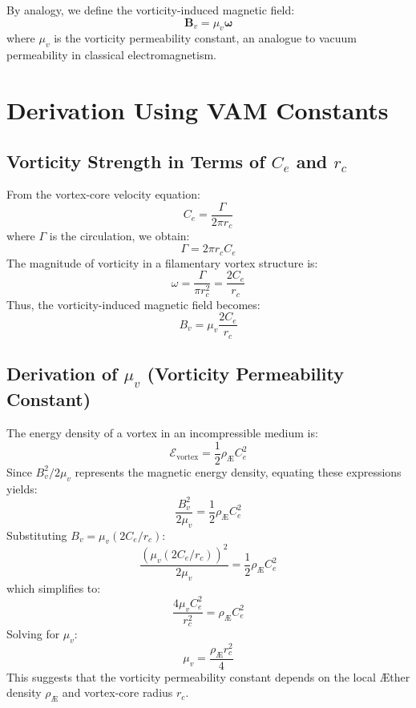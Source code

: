 By analogy, we define the vorticity-induced magnetic field:
\begin{equation}
    \boldsymbol{B}_v = \mu_v \boldsymbol{\omega}
\end{equation}
where $\mu_v$ is the vorticity permeability constant, an analogue to vacuum permeability in classical electromagnetism.

\section{Derivation Using VAM Constants}
\subsection{Vorticity Strength in Terms of $C_e$ and $r_c$}
From the vortex-core velocity equation:
\begin{equation}
    C_e = \frac{\Gamma}{2\pi r_c}
\end{equation}
where $\Gamma$ is the circulation, we obtain:
\begin{equation}
    \Gamma = 2\pi r_c C_e
\end{equation}
The magnitude of vorticity in a filamentary vortex structure is:
\begin{equation}
    \omega = \frac{\Gamma}{\pi r_c^2} = \frac{2 C_e}{r_c}
\end{equation}
Thus, the vorticity-induced magnetic field becomes:
\begin{equation}
    B_v = \mu_v \frac{2 C_e}{r_c}
\end{equation}

\subsection{Derivation of $\mu_v$ (Vorticity Permeability Constant)}
The energy density of a vortex in an incompressible medium is:
\begin{equation}
    \mathcal{E}_\text{vortex} = \frac{1}{2} \rho_{\text{\AE}} C_e^2
\end{equation}
Since $B_v^2 / 2 \mu_v$ represents the magnetic energy density, equating these expressions yields:
\begin{equation}
    \frac{B_v^2}{2 \mu_v} = \frac{1}{2} \rho_{\text{\AE}} C_e^2
\end{equation}
Substituting $B_v = \mu_v (2 C_e / r_c)$:
\begin{equation}
    \frac{(\mu_v (2 C_e / r_c))^2}{2 \mu_v} = \frac{1}{2} \rho_{\text{\AE}} C_e^2
\end{equation}
which simplifies to:
\begin{equation}
    \frac{4 \mu_v C_e^2}{r_c^2} = \rho_{\text{\AE}} C_e^2
\end{equation}
Solving for $\mu_v$:
\begin{equation}
    \mu_v = \frac{\rho_{\text{\AE}} r_c^2}{4}
\end{equation}
This suggests that the vorticity permeability constant depends on the local \AE ther density $\rho_{\text{\AE}}$ and vortex-core radius $r_c$.

